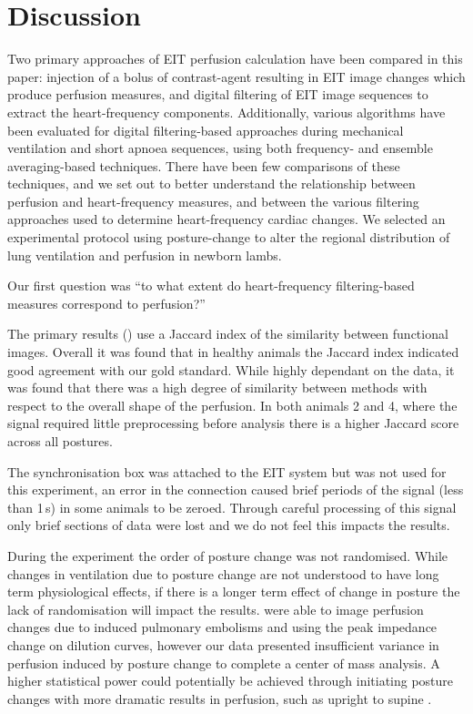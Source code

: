 \section{Discussion}                             %

Two primary approaches of EIT perfusion calculation
have been compared in this paper: injection
of a bolus of contrast-agent resulting 
in EIT image changes which produce perfusion measures, and
digital filtering of EIT image sequences to extract
the heart-frequency components.
Additionally, various algorithms have been evaluated
for digital filtering-based approaches during mechanical 
ventilation and short apnoea sequences, 
using both frequency- and ensemble averaging-based techniques.
There have been few comparisons of
these techniques, and 
we set out to better understand the relationship between
perfusion and heart-frequency measures, and between the various filtering
approaches used to determine heart-frequency cardiac changes.
We selected an experimental protocol using posture-change 
to alter the regional distribution of lung ventilation
and perfusion in newborn lambs.

Our first question was
``to what extent do heart-frequency filtering-based measures correspond to perfusion?''

The primary results () use a Jaccard index of the similarity
between functional images. Overall it was found that in healthy animals 
the Jaccard index indicated good agreement with our gold standard. While highly
dependant on the data, it was found that there was a high degree of similarity 
between methods with respect to
the overall shape of the perfusion. 
In both animals 2 and 4, where the signal required little preprocessing before analysis 
there is a higher Jaccard score across all postures.

The synchronisation box was attached to the EIT system but was not used for this experiment,
an error in the connection caused brief periods of the signal (less than 1\,s) in some animals to be zeroed.
Through careful processing of this signal only brief sections of data were lost and we do not feel this
impacts the results.

During the experiment the order of posture change was not randomised. 
While changes in ventilation due to posture change
are not understood to have long term physiological effects, if there is a longer term
effect of change in posture the lack of randomisation will impact the 
results.  were able to image perfusion changes due to induced 
pulmonary embolisms and using the peak impedance change on dilution curves,
however our data presented insufficient variance in perfusion induced by posture change to 
complete a center of mass analysis. A higher statistical power 
could potentially be achieved through initiating posture changes
with more dramatic results in perfusion, such as upright to supine \parencite{nakazato_quantitative_2010}.

